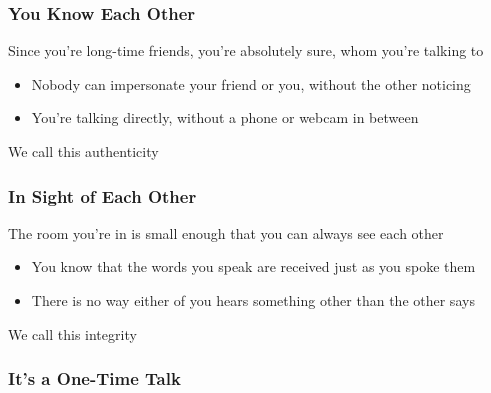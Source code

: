 \documentclass[
	aspectratio=169,
	xetex,
]{beamer}
\newcounter{i}
\begin{document}
\begin{frame}
	\frametitle{You Know Each Other}
	Since you're long-time friends, you're absolutely sure, whom you're talking to
	\begin{itemize}
		\item Nobody can impersonate your friend or you, without the other noticing
		\item You're talking directly, without a phone or webcam in between
	\end{itemize}
	We call this \alert{authenticity}
\end{frame}

\begin{frame}
	\frametitle{In Sight of Each Other}
	The room you're in is small enough that you can always see each other
	\begin{itemize}
		\item You know that the words you speak are received just as you spoke them
		\item There is no way either of you hears something other than the other says
	\end{itemize}
	We call this \alert{integrity}
\end{frame}

\begin{frame}
	\frametitle{It's a One-Time Talk}
\end{frame}
\end{document}
